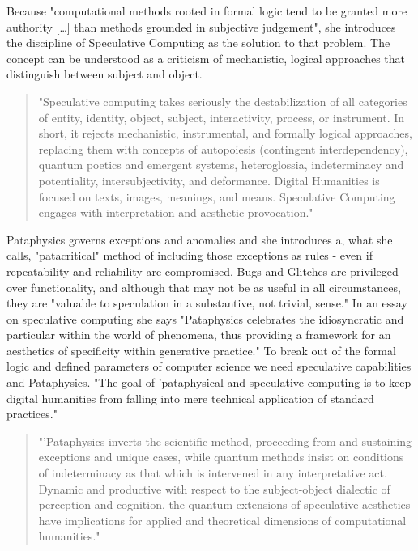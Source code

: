 Because "computational methods rooted in formal logic tend to be granted more authority […] than methods grounded in subjective judgement", she introduces the discipline of Speculative Computing as the solution to that problem.  The concept can be understood as a criticism of mechanistic, logical approaches that distinguish between subject and object.

\begin{quote}
  "Speculative computing takes seriously the destabilization of all categories of entity, identity, object, subject, interactivity, process, or instrument. In short, it rejects mechanistic, instrumental, and formally logical approaches, replacing them with concepts of autopoiesis (contingent interdependency), quantum poetics and emergent systems, heteroglossia, indeterminacy and potentiality, intersubjectivity, and deformance. Digital Humanities is focused on texts, images, meanings, and means. Speculative Computing engages with interpretation and aesthetic provocation." \citep[p.29]{Drucker2009}
\end{quote}

Pataphysics governs exceptions and anomalies and she introduces a, what she calls, "patacritical" method of including those exceptions as rules - even if repeatability and reliability are compromised. Bugs and Glitches are privileged over functionality, and although that may not be as useful in all circumstances, they are "valuable to speculation in a substantive, not trivial, sense." In an essay on speculative computing \citep{Drucker2007} she says  "Pataphysics celebrates the idiosyncratic and particular within the world of phenomena, thus providing a framework for an aesthetics of specificity within generative practice." To break out of the formal logic and defined parameters of computer science we need speculative capabilities and Pataphysics. "The goal of 'pataphysical and speculative computing is to keep digital humanities from falling into mere technical application of standard practices."

\begin{quote}
  "'Pataphysics inverts the scientific method, proceeding from and sustaining exceptions and unique cases, while quantum methods insist on conditions of indeterminacy as that which is intervened in any interpretative act. Dynamic and productive with respect to the subject-object dialectic of perception and cognition, the quantum extensions of speculative aesthetics have implications for applied and theoretical dimensions of computational humanities." \citep{Drucker2007}
\end{quote}

